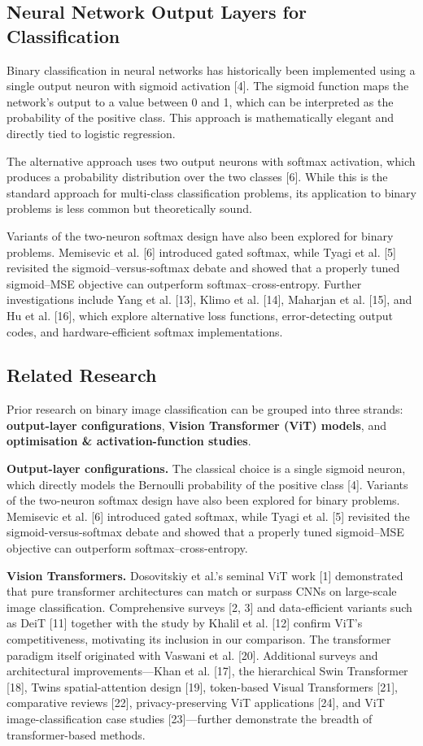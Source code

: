 \documentclass[11pt]{article}
\begin{document}
\subsection{Neural Network Output Layers for Classification}
Binary classification in neural networks has historically been implemented using a single output neuron with sigmoid activation [4]. The sigmoid function maps the network's output to a value between 0 and 1, which can be interpreted as the probability of the positive class. This approach is mathematically elegant and directly tied to logistic regression.

The alternative approach uses two output neurons with softmax activation, which produces a probability distribution over the two classes [6]. While this is the standard approach for multi-class classification problems, its application to binary problems is less common but theoretically sound.

Variants of the two-neuron softmax design have also been explored for binary problems. Memisevic et al. [6] introduced gated softmax, while Tyagi et al. [5] revisited the sigmoid–versus-softmax debate and showed that a properly tuned sigmoid–MSE objective can outperform softmax–cross-entropy. Further investigations include Yang et al. [13], Klimo et al. [14], Maharjan et al. [15], and Hu et al. [16], which explore alternative loss functions, error-detecting output codes, and hardware-efficient softmax implementations.

\subsection{Related Research}
Prior research on binary image classification can be grouped into three strands: \textbf{output-layer configurations}, \textbf{Vision Transformer (ViT) models}, and \textbf{optimisation \& activation-function studies}.

\textbf{Output-layer configurations.} The classical choice is a single sigmoid neuron, which directly models the Bernoulli probability of the positive class [4]. Variants of the two-neuron softmax design have also been explored for binary problems. Memisevic et al. [6] introduced gated softmax, while Tyagi et al. [5] revisited the sigmoid-versus-softmax debate and showed that a properly tuned sigmoid–MSE objective can outperform softmax–cross-entropy.

\textbf{Vision Transformers.} Dosovitskiy et al.'s seminal ViT work [1] demonstrated that pure transformer architectures can match or surpass CNNs on large-scale image classification. Comprehensive surveys [2, 3] and data-efficient variants such as DeiT [11] together with the study by Khalil et al. [12] confirm ViT's competitiveness, motivating its inclusion in our comparison. The transformer paradigm itself originated with Vaswani et al. [20]. Additional surveys and architectural improvements—Khan et al. [17], the hierarchical Swin Transformer [18], Twins spatial-attention design [19], token-based Visual Transformers [21], comparative reviews [22], privacy-preserving ViT applications [24], and ViT image-classification case studies [23]—further demonstrate the breadth of transformer-based methods.
\end{document}
